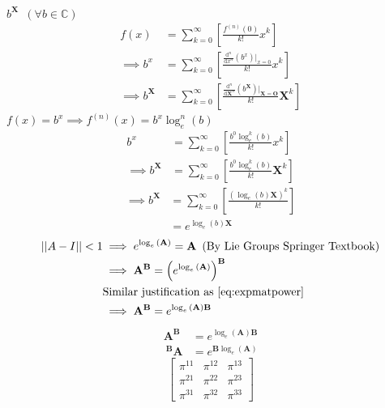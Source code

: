 \documentclass{article}
\begin{document}
$b^{\mathbf{X}}
\enspace (\forall b \in \mathbb{C})$
\begin{align*}
f\left( x \right) &= \sum^{\infty}_{k= 0}   \left[ \frac{f^{\left( n \right)}\left( 0 \right)}{k!} x^{k} \right]  \\
\implies  b^x &= \sum^{\infty}_{k= 0}  \left[ \frac{\frac{\mathrm{d}^n }{\mathrm{d} x^n}\left( b^x \right) \vert_{x=0}   }{k!} x^k \right]  \\
\implies  b^{\mathbf{X}} &= \sum^{\infty}_{k= 0}   \left[ \frac{\frac{\mathrm{d}^n }{\mathrm{d}\mathbf{X}^n  } \left( b^{\mathbf{X}} \right) \vert_{\mathbf{X}= \mathbf{O}}}{k!} \mathbf{X}^k \right]
\end{align*}
$f\left( x \right) = b^{x} \implies
f^{\left( n \right)}\left( x \right) = b^{x} \log_e^n{\left( b \right)}$
\begin{align*}
    b^x &= \sum^{\infty}_{k= 0}  \left[ \frac{b^0 \log_e^k{\left( b \right) }}{k!} x^k \right]  \\
    \implies  b^{\mathbf{X}} &= \sum^{\infty}_{k= 0}  \left[ \frac{b^0 \log_e^k{\left( b \right) }}{k!} \mathbf{X}^k \right]
\end{align*}
\begin{align*}
\implies  b^{\mathbf{X}} &= \sum^{\infty}_{k= 0}  {\left[ \frac{{\left( \log_e{\left( b \right) } \mathbf{X} \right)}^k}{k!} \right]} \\
    &= e^{\log_e{\left( b \right) } \mathbf{X}}
\end{align*}
\begin{align*}
    \left| \left| A-I \right| \right|<1  &\implies  e^{\log_e{\left( \mathbf{A} \right) }} = \mathbf{A} \enspace \text{(By Lie Groups Springer Textbook)}\\
                     &\implies  \mathbf{A}^{\mathbf{B}} =\left( e^{\log_e{\left( \mathbf{A} \right) }} \right)^{\mathbf{B}} \\
             & \text{Similar justification as \eqref{eq:expmatpower}} \\
             & \implies  \mathbf{A}^{\mathbf{B}}= e^{\log_e{\left( \mathbf{A} \right) } \mathbf{B}}
\end{align*}
\begin{align}
\mathbf{A}^{\mathbf{B}}&= e^{\log_e{\left( \mathbf{A} \right) } \mathbf{B}} \\
\ ^{\mathbf{B}} \mathbf{A} &= e^{ \mathbf{B} \log_e{\left( \mathbf{A} \right) } }
\end{align}
$$
\left[\begin{matrix}\pi^{11} & \pi^{12} & \pi^{13}\\\pi^{21} & \pi^{22} &
\pi^{23}\\\pi^{31} & \pi^{32} & \pi^{33}\end{matrix}\right]
$$
\end{document}

